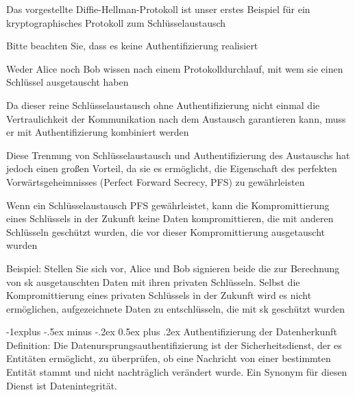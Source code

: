 \documentclass[a4paper]{article}
\makeatletter
\renewcommand{\subsection}{\@startsection{subsection}{2}{0mm}%
 {-1explus -.5ex minus -.2ex}%
 {0.5ex plus .2ex}%
 {\normalfont\normalsize\bfseries}}
\makeatother
\begin{document}
\begin{multicols}{3}
      \begin{itemize*}
            \item Das vorgestellte Diffie-Hellman-Protokoll ist unser erstes Beispiel für ein kryptographisches Protokoll zum Schlüsselaustausch
            \item Bitte beachten Sie, dass es keine Authentifizierung realisiert
            \begin{itemize*}
                  \item Weder Alice noch Bob wissen nach einem Protokolldurchlauf, mit wem sie einen Schlüssel ausgetauscht haben
                  \item Da dieser reine Schlüsselaustausch ohne Authentifizierung nicht einmal die Vertraulichkeit der Kommunikation nach dem Austausch garantieren kann, muss er mit Authentifizierung kombiniert werden
            \end{itemize*}
            \item Diese Trennung von Schlüsselaustausch und Authentifizierung des Austauschs hat jedoch einen großen Vorteil, da sie es ermöglicht, die Eigenschaft des perfekten Vorwärtsgeheimnisses (Perfect Forward Secrecy, PFS) zu gewährleisten
            \begin{itemize*}
                  \item Wenn ein Schlüsselaustausch PFS gewährleistet, kann die Kompromittierung eines Schlüssels in der Zukunft keine Daten kompromittieren, die mit anderen Schlüsseln geschützt wurden, die vor dieser Kompromittierung ausgetauscht wurden
                  \item Beispiel: Stellen Sie sich vor, Alice und Bob signieren beide die zur Berechnung von sk ausgetauschten Daten mit ihren privaten Schlüsseln. Selbst die Kompromittierung eines privaten Schlüssels in der Zukunft wird es nicht ermöglichen, aufgezeichnete Daten zu entschlüsseln, die mit sk geschützt wurden
            \end{itemize*}
      \end{itemize*}

      \subsection{Authentifizierung der Datenherkunft}
      Definition: Die Datenursprungsauthentifizierung ist der Sicherheitsdienst, der es Entitäten ermöglicht, zu überprüfen, ob eine Nachricht von einer bestimmten Entität stammt und nicht nachträglich verändert wurde. Ein Synonym für diesen Dienst ist Datenintegrität.


\end{multicols}
\end{document}
